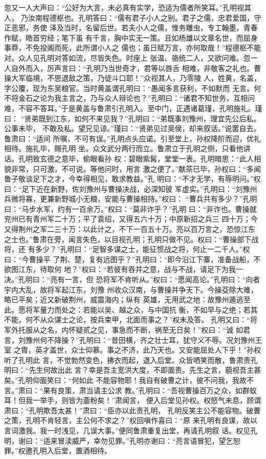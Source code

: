 忽又一人大声曰：“公好为大言，未必真有实学，恐适为儒者所笑耳。”孔明视其人，
乃汝南程德枢也。孔明答曰：“儒有君子小人之别。君子之儒，忠君爱国，守正恶邪，务使
泽及当时，名留后世。若夫小人之儒，惟务雕虫，专工翰墨，青春作赋，皓首穷经；笔下虽
有千言，胸中实无一策。且如杨雄以文章名世，而屈身事莽，不免投阁而死，此所谓小人之
儒也；虽日赋万言，亦何取哉！”程德枢不能对。众人见孔明对答如流，尽皆失色。时座上
张温、骆统二人，又欲问难。忽一人自外而入，厉声言曰：“孔明乃当世奇才，君等以唇舌
相难，非敬客之礼也。曹操大军临境，不思退敌之策，乃徒斗口耶！”众视其人，乃零陵
人，姓黄，名盖，字公覆，现为东吴粮官。当时黄盖谓孔明曰：“愚闻多言获利，不如默而
无言。何不将金石之论为我主言之，乃与众人辩论也？”孔明曰：“诸君不知世务，互相问
难，不容不答耳。”于是黄盖与鲁肃引孔明入。至中门，正遇诸葛瑾，孔明施礼。瑾曰：
“贤弟既到江东，如何不来见我？”孔明曰：“弟既事刘豫州，理宜先公后私。公事未毕，
不敢及私。望兄见谅。”瑾曰：“贤弟见过吴侯，却来叙话。”说罢自去。鲁肃曰：“适间
所嘱，不可有误。”孔明点头应诺。引至堂上，孙权降阶而迎，优礼相待。施礼毕，赐孔明
坐。众文武分两行而立。鲁肃立于孔明之侧，只看他讲话。孔明致玄德之意毕，偷眼看孙
权：碧眼紫髯，堂堂一表。孔明暗思：“此人相貌非常，只可激，不可说。等他问时，用言
激之便了。”献茶已毕，孙权曰：“多闻鲁子敬谈足下之才，今幸得相见，敢求教益。”孔
明曰：“不才无学，有辱明问。”权曰：“足下近在新野，佐刘豫州与曹操决战，必深知彼
军虚实。”孔明曰：“刘豫州兵微将寡，更兼新野城小无粮，安能与曹操相持。”权曰：
“曹兵共有多少？”孔明曰：“马步水军，约有一百余万。”权曰：“莫非诈乎？”孔明
曰：“非诈也。曹操就兖州已有青州军二十万；平了袁绍，又得五六十万；中原新招之兵三
四十万；今又得荆州之军二三十万：以此计之，不下一百五十万。亮以百万言之，恐惊江东
之士也。”鲁肃在旁，闻言失色，以目视孔明；孔明只做不见。权曰：“曹操部下战将，还
有多少？”孔明曰：“足智多谋之士，能征惯战之将，何止一二千人。”权曰：“今曹操平
了荆、楚，复有远图乎？”孔明曰：“即今沿江下寨，准备战船，不欲图江东，待取何
地？”权曰：“若彼有吞并之意，战与不战，请足下为我一决。”孔明曰：“亮有一言，但
恐将军不肯听从。”权曰：“愿闻高论。”孔明曰：“向者宇内大乱，故将军起江东，刘豫
州收众汉南，与曹操并争天下。今操芟除大难，略已平矣；近又新破荆州，威震海内；纵有
英雄，无用武之地：故豫州遁逃至此。愿将军量力而处之：若能以吴、越之众，与中国抗
衡，不如早与之绝；若其不能，何不从众谋士之论，按兵束甲，北面而事之？”权未及答。
孔明又曰：“将军外托服从之名，内怀疑贰之见，事急而不断，祸至无日矣！”权曰：“诚
如君言，刘豫州何不降操？”孔明曰：“昔田横，齐之壮士耳，犹守义不辱。况刘豫州王室
之胄，英才盖世，众士仰慕。事之不济，此乃天也。又安能屈处人下乎！”孙权听了孔明此
言，不觉勃然变色，拂衣而起，退入后堂。众皆哂笑而散，鲁肃责孔明曰：“先生何故出此
言？幸是吾主宽洪大度，不即面责。先生之言，藐视吾主甚矣。”孔明仰面笑曰：“何如此
不能容物耶！我自有破曹之计，彼不问我，我故不言。”肃曰：“果有良策，肃当请主公求
教。”孔明曰：“吾视曹操百万之众，如群蚁耳！但我一举手，则皆为齑粉矣！”肃闻言，
便入后堂见孙权。权怒气未息，顾谓肃曰：“孔明欺吾太甚！”肃曰：“臣亦以此责孔明，
孔明反笑主公不能容物。破曹之策，孔明不肯轻言，主公何不求之？”权回嗔作喜曰：“原
来孔明有良谋，故以言词激我。我一时浅见，几误大事。”便同鲁肃重复出堂，再请孔明叙
话。权见孔明，谢曰：“适来冒渎威严，幸勿见罪。”孔明亦谢曰：“亮言语冒犯，望乞恕
罪。”权邀孔明入后堂，置酒相待。

